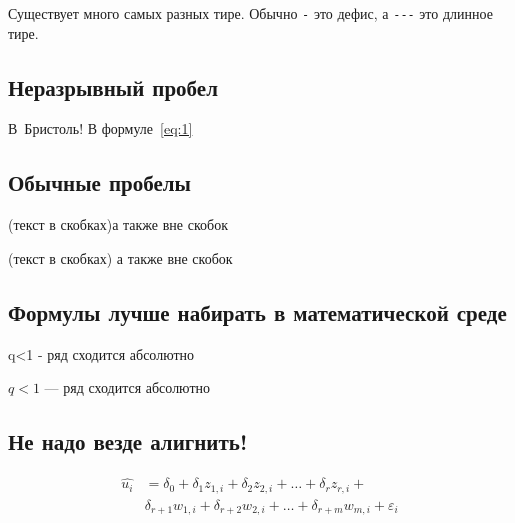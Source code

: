 \documentclass[12pt, a4paper]{article}
\begin{document}
Существует много самых разных тире.  Обычно 
\verb|-| это дефис, а \verb|---| это длинное тире.

\subsection{Неразрывный пробел}

В~Бристоль!  В формуле~\eqref{eq:1}

\subsection{Обычные пробелы}

(текст в скобках)а также вне скобок

(текст в скобках) а также вне скобок


\subsection{Формулы лучше набирать в математической среде}

q<1 - ряд сходится абсолютно 

$q < 1$ --- ряд сходится абсолютно 


\subsection{Не надо везде алигнить!}






  \begin{align}
\hat{u_i} &=\delta_0+\delta_1 z_{1,i} + \delta_2 z_{2,i}+ \ldots + \delta_r z_{r,i}+ \\
& \delta_{r+1} w_{1,i} + \delta_{r+2} w_{2,i} + \ldots + \delta_{r+m} w_{m,i} +\varepsilon_i  
 \tag{æææææ}
  \end{align} 

\vspace{5mm}

\end{document}
